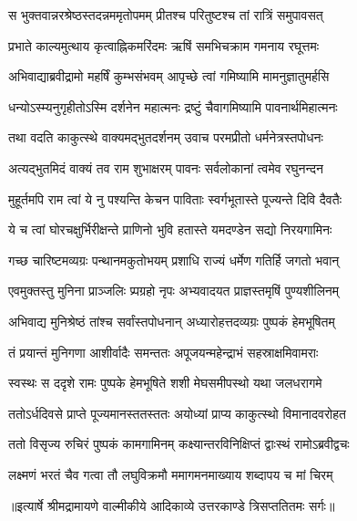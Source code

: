 \twolineshloka
{स भुक्तवान्नरश्रेष्ठस्तदन्नममृतोपमम्}
{प्रीतश्च परितुष्टश्च तां रात्रिं समुपावसत्} %

\twolineshloka
{प्रभाते काल्यमुत्थाय कृत्वाह्निकमरिंदमः}
{ऋषिं समभिचक्राम गमनाय रघूत्तमः} %

\twolineshloka
{अभिवाद्याब्रवीद्रामो महर्षिं कुम्भसंभवम्}
{आपृच्छे त्वां गमिष्यामि मामनुज्ञातुमर्हसि} %

\twolineshloka
{धन्योऽस्म्यनुगृहीतोऽस्मि दर्शनेन महात्मनः}
{द्रष्टुं चैवागमिष्यामि पावनार्थमिहात्मनः} %

\twolineshloka
{तथा वदति काकुत्स्थे वाक्यमद्भुतदर्शनम्}
{उवाच परमप्रीतो धर्मनेत्रस्तपोधनः} %

\twolineshloka
{अत्यद्भुतमिदं वाक्यं तव राम शुभाक्षरम्}
{पावनः सर्वलोकानां त्वमेव रघुनन्दन} %

\twolineshloka
{मुहूर्तमपि राम त्वां ये नु पश्यन्ति केचन}
{पाविताः स्वर्गभूतास्ते पूज्यन्ते दिवि दैवतैः} %

\twolineshloka
{ये च त्वां घोरचक्षुर्भिरीक्षन्ते प्राणिनो भुवि}
{हतास्ते यमदण्डेन सद्यो निरयगामिनः} %

\twolineshloka
{गच्छ चारिष्टमव्यग्रः पन्थानमकुतोभयम्}
{प्रशाधि राज्यं धर्मेण गतिर्हि जगतो भवान्} %

\twolineshloka
{एवमुक्तस्तु मुनिना प्राञ्जलिः प्र्पग्रहो नृपः}
{अभ्यवादयत प्राज्ञस्तमृषिं पुण्यशीलिनम्} %

\twolineshloka
{अभिवाद्य मुनिश्रेष्ठं तांश्च सर्वांस्तपोधनान्}
{अध्यारोहत्तदव्यग्रः पुष्पकं हेमभूषितम्} %

\twolineshloka
{तं प्रयान्तं मुनिगणा आशीर्वादैः समन्ततः}
{अपूजयन्महेन्द्राभं सहस्राक्षमिवामराः} %

\twolineshloka
{स्वस्थः स ददृशे रामः पुष्पके हेमभूषिते}
{शशी मेघसमीपस्थो यथा जलधरागमे} %

\twolineshloka
{ततोऽर्धदिवसे प्राप्ते पूज्यमानस्ततस्ततः}
{अयोध्यां प्राप्य काकुत्स्थो विमानादवरोहत} %

\twolineshloka
{ततो विसृज्य रुचिरं पुष्पकं कामगामिनम्}
{कक्ष्यान्तरविनिक्षिप्तं द्वाःस्थं रामोऽब्रवीद्वचः} %

\twolineshloka
{लक्ष्मणं भरतं चैव गत्वा तौ लघुविक्रमौ}
{ममागमनमाख्याय शब्दापय च मां चिरम्} %


{॥इत्यार्षे श्रीमद्रामायणे वाल्मीकीये आदिकाव्ये उत्तरकाण्डे त्रिसप्ततितमः सर्गः॥}


